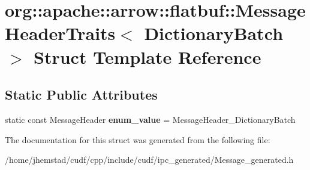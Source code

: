 \hypertarget{structorg_1_1apache_1_1arrow_1_1flatbuf_1_1MessageHeaderTraits_3_01DictionaryBatch_01_4}{}\section{org\+:\+:apache\+:\+:arrow\+:\+:flatbuf\+:\+:Message\+Header\+Traits$<$ Dictionary\+Batch $>$ Struct Template Reference}
\label{structorg_1_1apache_1_1arrow_1_1flatbuf_1_1MessageHeaderTraits_3_01DictionaryBatch_01_4}
\subsection*{Static Public Attributes}
\begin{DoxyCompactItemize}
\item 
static const Message\+Header {\bfseries enum\+\_\+value} = Message\+Header\+\_\+\+Dictionary\+Batch\hypertarget{structorg_1_1apache_1_1arrow_1_1flatbuf_1_1MessageHeaderTraits_3_01DictionaryBatch_01_4_a5f52cac75391abecb0d0c6bbff497c36}{}\label{structorg_1_1apache_1_1arrow_1_1flatbuf_1_1MessageHeaderTraits_3_01DictionaryBatch_01_4_a5f52cac75391abecb0d0c6bbff497c36}

\end{DoxyCompactItemize}


The documentation for this struct was generated from the following file\+:\begin{DoxyCompactItemize}
\item 
/home/jhemstad/cudf/cpp/include/cudf/ipc\+\_\+generated/Message\+\_\+generated.\+h\end{DoxyCompactItemize}
